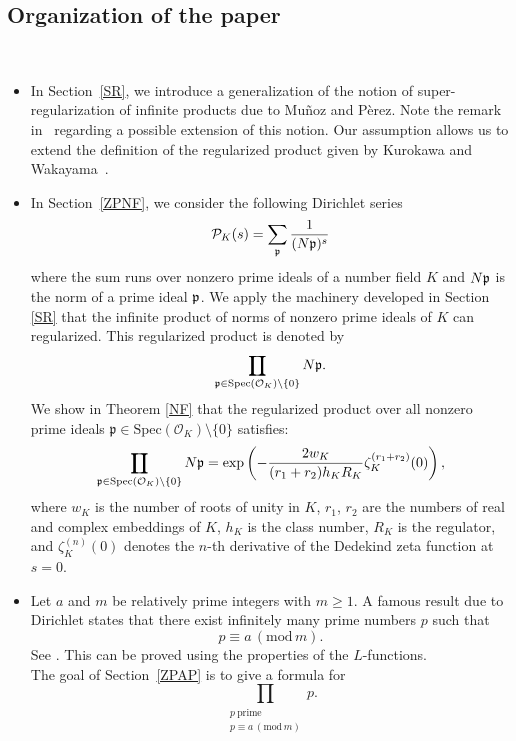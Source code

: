 \documentclass[12pt]{amsart}
\DeclareMathOperator*\Rprod{%
\mathchoice
  {\ooalign{$\displaystyle\prod$\cr\hidewidth$\displaystyle\coprod$\hidewidth\cr}}%
  {\ooalign{$\textstyle\prod$\cr\hidewidth$\textstyle\coprod$\hidewidth\cr}}%
  {\ooalign{$\scriptstyle\prod$\cr\hidewidth$\scriptstyle\coprod$\hidewidth\cr}}%
  {\ooalign{$\scriptscriptstyle\prod$\cr\hidewidth$%
  \scriptscriptstyle\coprod$\hidewidth\cr}}}
\begin{document}
\subsection*{Organization of the paper}
\
\begin{itemize}
\item 
In Section~\ref{SR}, we introduce a generalization of the notion of super-regularization of infinite products due to Mu\~{n}oz and P\`erez. 
Note the remark in~\cite[p.~73]{Marco_prime} regarding a possible extension of this notion. Our assumption allows us to extend the definition of the regularized product given by Kurokawa and Wakayama~\cite{Kurokawa1, Kurokawa-2005}.
\item 
In Section~\ref{ZPNF}, we consider the following Dirichlet series \[
\mathcal{P}_K(s)=\sum_{\frak p } \frac{1}{(N \frak p)^s}
\]
where the sum runs over  nonzero prime ideals of a number field $K$ and $N\frak p$ is the norm of a prime ideal $\frak p$. We apply the machinery developed in Section \ref{SR} 
that the infinite product of norms of nonzero prime ideals of $K$ can regularized. This regularized product is denoted by
\[
\Rprod_{\mathfrak{p} \in \mathrm{Spec}(\mathcal{O}_K) \setminus \{0\}} N\mathfrak{p}.
\]
We show in Theorem \ref{NF} that 
the regularized product over all nonzero prime ideals $\mathfrak{p} \in \mathrm{Spec}(\mathcal{O}_K) \setminus \{0\}$ satisfies:
\[
\Rprod_{\mathfrak{p} \in \mathrm{Spec}(\mathcal{O}_K) \setminus \{0\}} N\mathfrak{p} = \exp\left( -\frac{2 w_K}{(r_1 + r_2) h_K R_K}  \zeta_K^{(r_1 + r_2)}(0) \right),
\]
where
$w_K$ is the number of roots of unity in $K$, $r_1$, $r_2$ are the numbers of real and complex embeddings of $K$,
  $h_K$ is the class number,
  $R_K$ is the regulator, and 
  $\zeta_K^{(n)}(0)$ denotes the $n$-th derivative of the Dedekind zeta function at $s=0$.\\

\item 



Let $a$ and $m$ be relatively prime integers with $m \geq 1$. A famous result due to Dirichlet states that there exist infinitely many prime numbers $p$ such that
\[
p \equiv a\, (\mathrm{mod}\,{m}).
\]
See \cite{Serre_arithmetic}. This can be proved using the properties of the $L$-functions. \\ The goal of Section~\ref{ZPAP} is to give a formula for 
\[
\prod_{\substack{p\ \text{prime} \\ p \equiv a\, (\mathrm{mod}\,{m})}} p.
\]


\end{itemize}
\end{document}
